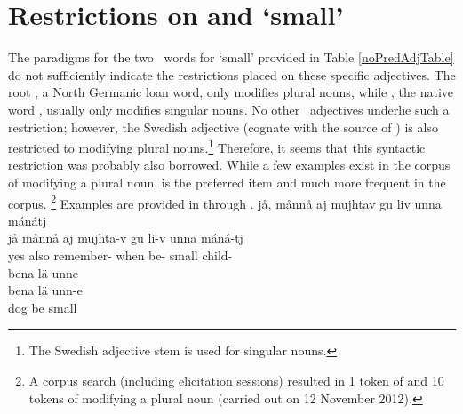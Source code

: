 \section{Restrictions on  and  ‘small’}\label{smallADJs}
The paradigms for the two \PS\ words for ‘small’ provided in Table \vref{noPredAdjTable} do not sufficiently indicate the restrictions placed on these specific adjectives. The root , a North Germanic loan word, only modifies plural nouns, while \mbox{,} %
the native word \citep[265]{Sammallahti1998}, usually only modifies singular nouns. 
No other \PS\ adjectives underlie such a restriction; however, the Swedish adjective  (cognate with the source of ) is also restricted to modifying plural nouns.\footnote{The Swedish adjective stem  is used for singular nouns.} 
Therefore, it seems that this syntactic restriction was probably also borrowed. While a few examples exist in the corpus of  modifying a plural noun,  is the preferred item and much more frequent in the corpus.%
\footnote{A corpus search (including elicitation sessions) resulted in 1 token of  and 10 tokens of  modifying a plural noun (carried out on 12 November 2012).} 
Examples are provided in  through .
\ea\label{smallADJex1}
\glll	jå, månnå aj mujhtav gu liv unna mánátj\\
	jå månnå aj mujhta-v gu li-v unna máná-tj\\
	yes  also remember- when be- small child-\BS{}\\\nopagebreak
{}	
\z
\ea\label{smallADJex2}
\glll	bena lä unne\\
	bena lä unn-e\\
	dog\BS{} be\BS{} small\BS{}\\\nopagebreak
{}	

